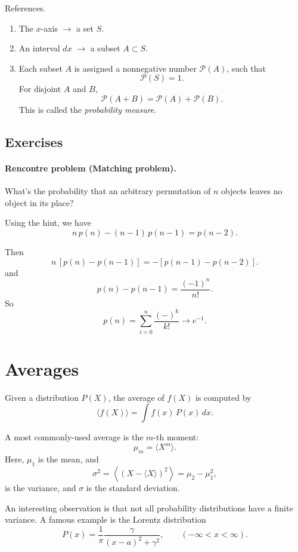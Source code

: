 \documentclass{book}
\numberwithin{equation}{section}
\theoremstyle{plain}
\theoremstyle{definition}
\theoremstyle{remark}
\begin{document}
References\cite{kolmogorov}.

\begin{enumerate}
\item The $x$-axis $\rightarrow$ a set $S$.
\item An interval $dx$ $\rightarrow$ a subset $A \subset S$.
\item Each subset $A$ is assigned
  a nonnegative number $\mathcal P(A)$, such that
  $$
  \mathcal P(S) = 1.
  $$
  For disjoint $A$ and $B$,
  $$
  \mathcal P(A + B) = \mathcal P(A) + \mathcal P(B).
  $$
  This is called the \emph{probability measure}.
\end{enumerate}

\subsection*{Exercises}

\paragraph{Rencontre problem (Matching problem).}

What's the probability that an arbitrary permutation
of $n$ objects leaves no object in its place?

Using the hint, we have
$$
n \, p(n) - (n-1) \, p(n-1) = p(n-2).
$$

Then
$$
n \, [p(n) - p(n-1)] = - [ p(n-1) - p(n-2)].
$$
and
$$
p(n) - p(n-1) = \frac{ (-1)^{n} }{n!}.
$$
So
$$
p(n) = \sum_{i = 0}^n \frac{ (-)^{k} } { k! } \rightarrow e^{-1}.
$$




\section{Averages}

Given a distribution $P(X)$, the average of $f(X)$ is computed by
$$
\langle f(X) \rangle
=
\int f(x) \, P(x) \, dx.
$$

A most commonly-used average is the $m$-th moment:
$$
\mu_m = \langle X^m \rangle.
$$
Here, $\mu_1$ is the mean, and
\begin{equation}
\sigma^2 =
\left\langle
  (X - \langle X \rangle )^2
\right\rangle
= \mu_2 - \mu_1^2,
\end{equation}
is the variance, and $\sigma$ is the standard deviation.

An interesting observation is that
not all probability distributions have a finite variance.
%
A famous example is the Lorentz distribution
\begin{equation}
P(x) = \frac{1}{\pi} \frac{\gamma}{ (x-a)^2 + \gamma^2 },
\qquad (-\infty < x < \infty).
\end{equation}
\end{document}
